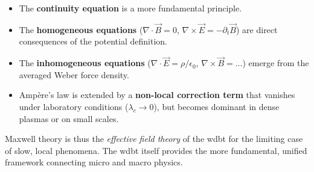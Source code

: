 \begin{itemize}
    \item The \textbf{continuity equation} is a more fundamental principle.
    \item The \textbf{homogeneous equations} ($\nabla \cdot \vec{B} = 0$, $\nabla \times \vec{E} = -\partial_t \vec{B}$) are direct consequences of the potential definition.
    \item The \textbf{inhomogeneous equations} ($\nabla \cdot \vec{E} = \rho/\epsilon_0$, $\nabla \times \vec{B} = \ldots$) emerge from the averaged Weber force density.
    \item Ampère's law is extended by a \textbf{non-local correction term} that vanishes under laboratory conditions ($\lambda_c \rightarrow 0$), but becomes dominant in dense plasmas or on small scales.
\end{itemize}

Maxwell theory is thus the \textit{effective field theory} of the \gls{wdbt} for the limiting case of slow, local phenomena. The \gls{wdbt} itself provides the more fundamental, unified framework connecting micro and macro physics.
